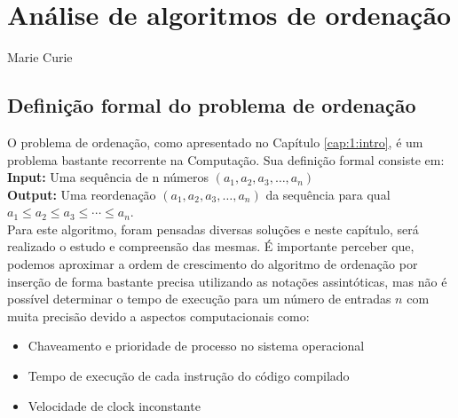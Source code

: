 
\chapter{Análise de algoritmos de ordenação}
\label{cap:2:sorting}

{Marie Curie}

\section{Definição formal do problema de ordenação}

O problema de ordenação, como apresentado no Capítulo \ref{cap:1:intro}, é um problema bastante recorrente na Computação.
Sua definição formal consiste em: \\

\textbf{Input: } Uma sequência de n números $(a_1, a_2, a_3,\ldots, a_n)$ \\

\textbf{Output: } Uma reordenação $(a_1, a_2, a_3,\ldots, a_n)$ da sequência para qual \\
$a_1 \leq a_2 \leq a_3 \leq \cdots \leq a_n$. \\

Para este algoritmo, foram pensadas diversas soluções e neste capítulo, será realizado o estudo e compreensão das
mesmas. É importante perceber que, podemos aproximar a ordem de crescimento do algoritmo de ordenação
por inserção de forma bastante precisa utilizando as notações assintóticas, mas não é possível
determinar o tempo de execução para um número de entradas $n$ com muita precisão devido a aspectos
computacionais como:

\begin{itemize}
    \item Chaveamento e prioridade de processo no sistema operacional
    \item Tempo de execução de cada instrução do código compilado
    \item Velocidade de clock inconstante
\end{itemize}

